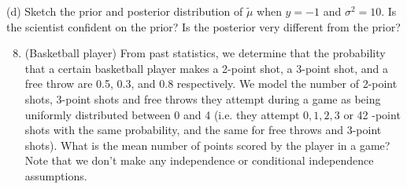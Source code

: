 \documentclass[10pt]{article}
\begin{document}
(d) Sketch the prior and posterior distribution of $\tilde{\mu}$ when $y=-1$ and $\sigma^{2}=10$. Is the scientist confident on the prior? Is the posterior very different from the prior?

\begin{enumerate}
  \setcounter{enumi}{7}
  \item (Basketball player) From past statistics, we determine that the probability that a certain basketball player makes a 2-point shot, a 3-point shot, and a free throw are 0.5, 0.3, and $0.8$ respectively. We model the number of 2-point shots, 3-point shots and free throws they attempt during a game as being uniformly distributed between 0 and 4 (i.e. they attempt $0,1,2,3$ or 42 -point shots with the same probability, and the same for free throws and 3-point shots). What is the mean number of points scored by the player in a game? Note that we don't make any independence or conditional independence assumptions.




\end{enumerate}
\end{document}
